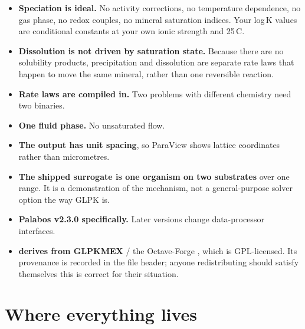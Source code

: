 \begin{itemize}[leftmargin=1.2em]
\item \textbf{Speciation is ideal.} No activity corrections, no temperature
dependence, no gas phase, no redox couples, no mineral saturation indices. Your
log\,K values are conditional constants at your own ionic strength and
25\,\textdegree C.

\item \textbf{Dissolution is not driven by saturation state.} Because there are
no solubility products, precipitation and dissolution are separate rate laws
that happen to move the same mineral, rather than one reversible reaction.

\item \textbf{Rate laws are compiled in.} Two problems with different chemistry
need two binaries.

\item \textbf{One fluid phase.} No unsaturated flow.

\item \textbf{The  output has unit spacing}, so ParaView shows
lattice coordinates rather than micrometres.

\item \textbf{The shipped surrogate is one organism on two substrates} over one
range. It is a demonstration of the mechanism, not a general-purpose solver
option the way GLPK is.

\item \textbf{Palabos v2.3.0 specifically.} Later versions change
data-processor interfaces.

\item \textbf{ derives from GLPKMEX} / the
Octave-Forge , which is GPL-licensed. Its provenance is
recorded in the file header; anyone redistributing should satisfy themselves
this is correct for their situation.
\end{itemize}

\chapter{Where everything lives}
\label{ch:filemap}

